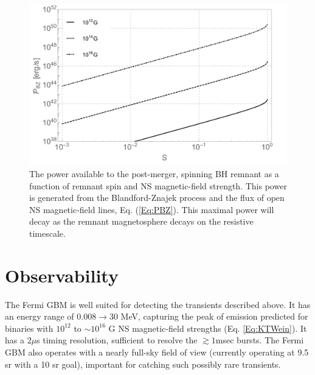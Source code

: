 \begin{figure}
\begin{center}
\includegraphics[scale=0.33]{figures/ch7/PostMergerLum_BZ.pdf} \vspace{-20 pt}
\end{center}
\caption{The power available to the post-merger, spinning BH remnant
  as a function of remnant spin and NS magnetic-field strength. This
  power is generated from the Blandford-Znajek process and the flux of
  open NS magnetic-field lines, Eq. (\ref{Eq:PBZ}). This maximal power
  will decay as the remnant magnetosphere decays on the resistive
  timescale.}
\label{Fig:PostMerger}
\end{figure}



\section{Observability}
\label{Observability}
The Fermi GBM \citep[GBM][]{FERMIGBM:2015} is well suited for detecting
the transients described above. It has an energy range of $0.008
\rightarrow 30$ MeV, capturing the peak of emission predicted for
binaries with $10^{12}$ to $\sim 10^{16}$ G NS magnetic-field
strengths (Eq. \ref{Eq:KTWein}). It has a $2 \mu$s timing resolution,
sufficient to resolve the $\gtrsim 1$msec bursts. The Fermi GBM also
operates with a nearly full-sky field of view (currently operating at
9.5 sr with a 10 sr goal), important for catching such possibly rare
transients.

